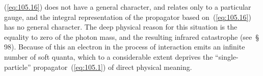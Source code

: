 
\noindent (\ref{eq:105.16}) does not have a general character, and relates only to a particular gauge, and the integral representation of the propagator based on~(\ref{eq:105.16}) has no general character. The deep physical reason for this situation is the equality to zero of the photon mass, and the resulting infrared catastrophe (see~\S\,98). Because of this an electron in the process of interaction emits an infinite number of soft quanta, which to a considerable extent deprives the ``single-particle'' propagator~(\ref{eq:105.1}) of direct physical meaning.
